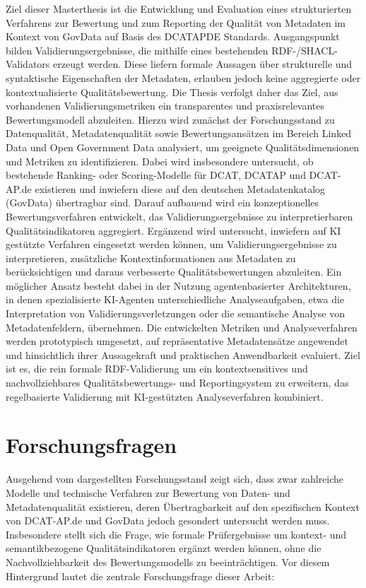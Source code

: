 Ziel dieser Masterthesis ist die Entwicklung und Evaluation eines strukturierten Verfahrens zur Bewertung und zum Reporting der Qualität von Metadaten im Kontext von GovData auf Basis des \acrfull{DCATAPDE} Standards. Ausgangspunkt bilden Validierungsergebnisse, die mithilfe eines bestehenden RDF-/SHACL-Validators erzeugt werden. Diese liefern formale Aussagen über strukturelle und syntaktische Eigenschaften der Metadaten, erlauben jedoch keine aggregierte oder kontextualisierte Qualitätsbewertung.
Die Thesis verfolgt daher das Ziel, aus vorhandenen Validierungsmetriken ein transparentes und praxisrelevantes Bewertungsmodell abzuleiten. Hierzu wird zunächst der Forschungsstand zu Datenqualität, Metadatenqualität sowie Bewertungsansätzen im Bereich Linked Data und Open Government Data analysiert, um geeignete Qualitätsdimensionen und Metriken zu identifizieren.
Dabei wird insbesondere untersucht, ob bestehende Ranking- oder Scoring-Modelle für \acrfull{DCAT}, \acrfull{DCATAP} und DCAT-AP.de existieren und inwiefern diese auf den deutschen Metadatenkatalog (GovData) übertragbar sind.
Darauf aufbauend wird ein konzeptionelles Bewertungsverfahren entwickelt, das Validierungsergebnisse zu interpretierbaren Qualitätsindikatoren aggregiert. Ergänzend wird untersucht, inwiefern auf \acrfull{KI} gestützte Verfahren eingesetzt werden können, um Validierungsergebnisse zu interpretieren, zusätzliche Kontextinformationen aus Metadaten zu berücksichtigen und daraus verbesserte Qualitätsbewertungen abzuleiten. Ein möglicher Ansatz besteht dabei in der Nutzung agentenbasierter Architekturen, in denen spezialisierte KI-Agenten unterschiedliche Analyseaufgaben, etwa die Interpretation von Validierungsverletzungen oder die semantische Analyse von Metadatenfeldern, übernehmen.
Die entwickelten Metriken und Analyseverfahren werden prototypisch umgesetzt, auf repräsentative Metadatensätze angewendet und hinsichtlich ihrer Aussagekraft und praktischen Anwendbarkeit evaluiert. Ziel ist es, die rein formale RDF-Validierung um ein kontextsensitives und nachvollziehbares Qualitätsbewertungs- und Reportingsystem zu erweitern, das regelbasierte Validierung mit KI-gestützten Analyseverfahren kombiniert.

\section{Forschungsfragen}
\label{sec:forschungsfragen}

Ausgehend vom dargestellten Forschungsstand zeigt sich, dass zwar zahlreiche Modelle und technische Verfahren zur Bewertung von Daten- und Metadatenqualität existieren, deren Übertragbarkeit auf den spezifischen Kontext von DCAT-AP.de und GovData jedoch gesondert untersucht werden muss. Insbesondere stellt sich die Frage, wie formale Prüfergebnisse um kontext- und semantikbezogene Qualitätsindikatoren ergänzt werden können, ohne die Nachvollziehbarkeit des Bewertungsmodells zu beeinträchtigen. Vor diesem Hintergrund lautet die zentrale Forschungsfrage dieser Arbeit:

